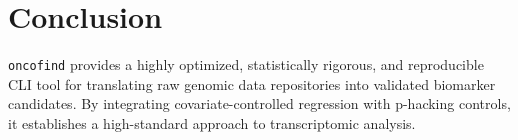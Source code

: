 \documentclass[11pt,a4paper]{article}
\begin{document}
\section{Conclusion}
\texttt{oncofind} provides a highly optimized, statistically rigorous, and reproducible CLI tool for translating raw genomic data repositories into validated biomarker candidates. By integrating covariate-controlled regression with p-hacking controls, it establishes a high-standard approach to transcriptomic analysis. 



\end{document}
